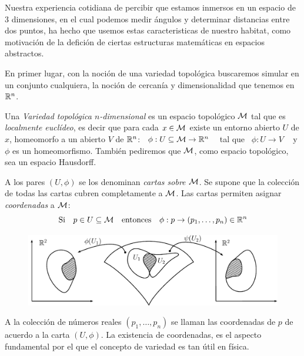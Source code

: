 {}
\label{s:WL:VariedadToplogica}

Nuestra experiencia cotidiana de percibir  que estamos inmersos en un espacio de
3 dimensiones, en el cual  podemos medir \'angulos y determinar distancias entre
dos puntos, ha  hecho que usemos estas caracteristicas  de nuestro habitat, como
motivaci\'on de  la defici\'on de ciertas estructuras  matem\'aticas en espacios
abstractos.

En primer lugar, con la noci\'on de una variedad topol\'ogica buscaremos simular
en  un conjunto  cualquiera, la  noci\'on  de cercan\'ia  y dimensionalidad  que
tenemos en $\mathbb{R}^n$.

\begin{definicion}
  Una  {\it Variedad  topol\'ogica $n$-dimensional}  es un  espacio topol\'ogico
  $\mathcal{M}$ tal que es {\it localmente eucl\'ideo}, es decir que para cada $x \in \mathcal{M}$
  existe  un  entorno  abierto $U$  de  $x$,  homeomorfo  a  un abierto  $V$  de
  $\mathbb{R}^n$: \ $\phi: U \subseteq \mathcal{M} \rightarrow \mathbb{R}^n$ \
  tal que \ $\phi:U \rightarrow V$ \
  y  $\phi$ es  un homeomorfismo.  Tambi\'en  pediremos que  $\mathcal{M}$, como  espacio
  topol\'ogico, sea un espacio Hausdorff.
\end{definicion}
%
A los pares  $(U,\phi)$ se los denominan {\it cartas sobre  $\mathcal{M}$}. Se supone que
la  colecci\'on de  todas las  cartas cubren  completamente a  $\mathcal{M}$.  Las cartas
permiten asignar {\it coordenadas} a $\mathcal{M}$:
%
\[
\mbox{Si}  \quad  p \in  U  \subseteq \mathcal{M}  \quad  \mbox{entonces}  \quad \phi:  p
\rightarrow (p_1 , \ldots , p_n) \in \mathbb{R}^n
\]

\begin{figure}[h!]
  \centerline{\includegraphics[width=13cm]{figura1.pdf}}          
\end{figure}

A  la colecci\'on  de n\'umeros  reales $(p_1  , \ldots  , p_n)$  se  llaman las
coordenadas  de  $p$  de  acuerdo  a  la carta  $(U,\phi)$.   La  existencia  de
coordenadas, es el aspecto fundamental por el que el concepto de variedad es tan
\'util en f\'isica.

